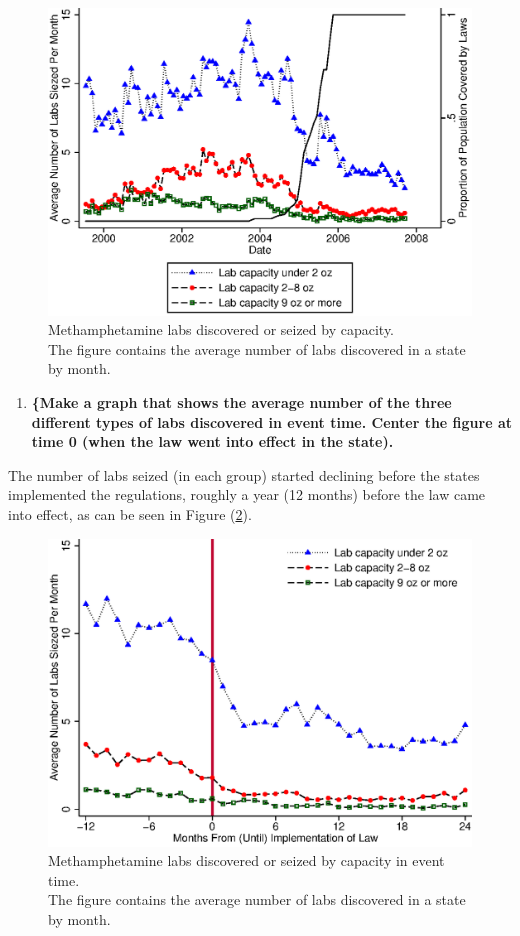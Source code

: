 \documentclass[
  11pt,
]{article}
\providecommand{\tightlist}{%
  \setlength{\itemsep}{0pt}\setlength{\parskip}{0pt}}
\begin{document}
\begin{figure}[hbt!]
 \centering
 \includegraphics{number_of_labs_siezed-timeseries.eps}
 \caption{Methamphetamine labs discovered or seized by capacity. \\ The
figure contains the average number of labs discovered in a state by
month.}
\label{fig-1}
\end{figure}

\begin{enumerate}
\def\labelenumi{(\alph{enumi})}
\setcounter{enumi}{1}
\tightlist
\item
  \textbf{\{Make a graph that shows the average number of the three
  different types of labs discovered in event time. Center the figure at
  time 0 (when the law went into effect in the state).}
\end{enumerate}

The number of labs seized (in each group) started declining before the
states implemented the regulations, roughly a year (12 months) before
the law came into effect, as can be seen in Figure (\ref{fig-2}).

\begin{figure}[hbt!]
 \centering
 \includegraphics{month_from_until_otc-vs-lab_size.eps}
 \caption{Methamphetamine labs discovered or seized by capacity in event time.\\ The figure contains the average number of labs discovered in a state by month.}
\label{fig-2}
\end{figure}
\end{document}
